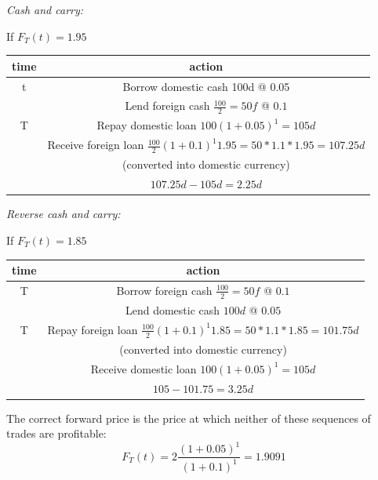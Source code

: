 \textit{Cash and carry:}

If $F_T(t)=1.95$

\begin{center} \begin{tabular}{|c|c|}
  \hline
  time & action \\
  \hline
   t & Borrow domestic cash 100d @ 0.05 \\
    & Lend foreign cash $\frac{100}{2} = 50f$ @ $0.1$  \\
  \hline
 T & Repay domestic loan $100(1+0.05)^{1} = 105d$ \\
   & Receive foreign loan $\frac{100}{2}(1+0.1)^{1}1.95 = 50*1.1*1.95 = 107.25d$ \\
   &  (converted into domestic currency) \\
  \hline
   & $107.25d-105d = 2.25d$\\
  \hline
\end{tabular}\end{center}

\textit{Reverse cash and carry:}

If $F_T(t)=1.85$

\begin{center} \begin{tabular}{|c|c|}
  \hline
  time & action \\
  \hline
  T  & Borrow foreign cash $\frac{100}{2} = 50f$ @ $0.1$ \\
    & Lend domestic cash $100d$ @ $0.05$  \\
  \hline
  T & Repay foreign loan $\frac{100}{2}(1+0.1)^{1}1.85 = 50*1.1*1.85 = 101.75d$ \\
  & (converted into domestic currency)  \\
   & Receive domestic loan $100(1+0.05)^{1} = 105d$ \\
  \hline
   & $105-101.75 = 3.25d$\\
  \hline
\end{tabular}\end{center}


The correct forward price is the price at which neither of these sequences of trades are profitable:
\[ F_{T}(t) = 2\frac{(1+0.05)^1}{(1+0.1)^1} = 1.9091 \]

